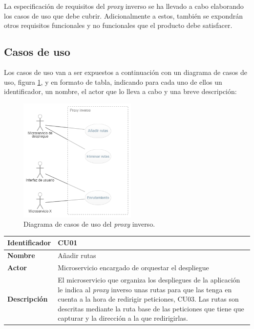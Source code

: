 \documentclass[11pt,spanish,listoffigures]{tfgetsinf}
\begin{document}
La especificación de requisitos del \emph{proxy} inverso se ha llevado a cabo elaborando los casos de uso que debe cubrir. Adicionalmente a estos, también se expondrán otros requisitos funcionales y no funcionales que el producto debe satisfacer.


		\subsection{Casos de uso} \label{casosDeUso}

Los casos de uso van a ser expuestos a continuación con un diagrama de casos de uso, figura \ref{diagramaCasosDeUso}, y en formato de tabla, indicando para cada uno de ellos un identificador, un nombre, el actor que lo lleva a cabo y una breve descripción:

\begin{figure}[ht]
\centering
\includegraphics[width=0.52\textwidth]{imagenes/diagramaCasosDeUso}
\caption{Diagrama de casos de uso del \emph{proxy} inverso.}
	\label{diagramaCasosDeUso}
\end{figure}

\begin{center} \begin{tabular}{| l | p{11.3cm} |}
\hline
\textbf{Identificador} & CU01
\\ \hline
\textbf{Nombre} & Añadir rutas
\\ \hline
\textbf{Actor} & Microservicio encargado de orquestar el despliegue
\\ \hline
\textbf{Descripción} & El microservicio que organiza los despliegues de la aplicación le indica al \emph{proxy} inverso unas rutas para que las tenga en cuenta a la hora de redirigir peticiones, CU03. Las rutas son descritas mediante la ruta base de las peticiones que tiene que capturar y la dirección a la que redirigirlas.
\\ \hline \end{tabular} \end{center}
\end{document}
